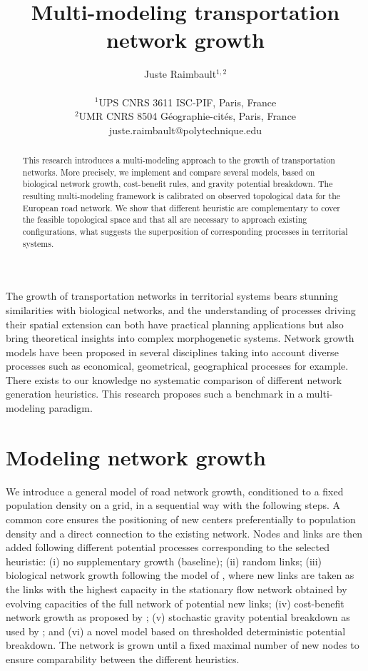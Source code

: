 \documentclass[letterpaper]{article}
\title{Multi-modeling transportation network growth}
\author{Juste Raimbault$^{1,2}$\\
\mbox{}\\
$^1$UPS CNRS 3611 ISC-PIF, Paris, France \\
$^2$UMR CNRS 8504 G{\'e}ographie-cit{\'e}s, Paris, France \\
juste.raimbault@polytechnique.edu} %
\begin{document}
\maketitle

\begin{abstract}
This research introduces a multi-modeling approach to the growth of transportation networks. More precisely, we implement and compare several models, based on biological network growth, cost-benefit rules, and gravity potential breakdown. The resulting multi-modeling framework is calibrated on observed topological data for the European road network. We show that different heuristic are complementary to cover the feasible topological space and that all are necessary to approach existing configurations, what suggests the superposition of corresponding processes in territorial systems.
\end{abstract}



The growth of transportation networks in territorial systems bears stunning similarities with biological networks, and the understanding of processes driving their spatial extension can both have practical planning applications but also bring theoretical insights into complex morphogenetic systems. Network growth models have been proposed in several disciplines \citep{xie2009modeling} taking into account diverse processes such as economical, geometrical, geographical processes for example. There exists to our knowledge no systematic comparison of different network generation heuristics. This research proposes such a benchmark in a multi-modeling paradigm.


\section{Modeling network growth}

We introduce a general model of road network growth, conditioned to a fixed population density on a grid, in a sequential way with the following steps. A common core ensures the positioning of new centers preferentially to population density and a direct connection to the existing network. Nodes and links are then added following different potential processes corresponding to the selected heuristic: (i) no supplementary growth (baseline); (ii) random links; (iii) biological network growth following the model of \cite{tero2010rules}, where new links are taken as the links with the highest capacity in the stationary flow network obtained by evolving capacities of the full network of potential new links; (iv) cost-benefit network growth as proposed by \cite{louf2013emergence}; (v) stochastic gravity potential breakdown as used by \cite{schmitt2014modelisation}; and (vi) a novel model based on thresholded deterministic potential breakdown. The network is grown until a fixed maximal number of new nodes to ensure comparability between the different heuristics.
\end{document}
